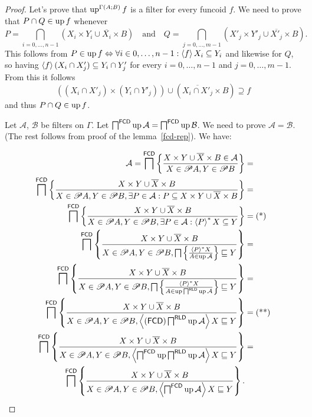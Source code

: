 \begin{proof}
Let's prove that $\operatorname{up}^{\Gamma(A;B)}f$ is a filter for every funcoid
$f$. We need to prove that $P\cap Q\in\operatorname{up} f$ whenever 
\[
P=\bigcap_{i=0,\ldots,n-1}\left(X_{i}\times Y_{i}\cup\overline{X_{i}}\times B\right)\quad\text{and}\quad Q=\bigcap_{j=0,\ldots,m-1}\left(X'_{j}\times Y'_{j}\cup\overline{X'_{j}}\times B\right).
\]
This follows from $P\in\operatorname{up} f\Leftrightarrow\forall i\in0,\ldots,n-1:\left\langle f\right\rangle X_{i}\subseteq Y_{i}$
and likewise for $Q$, so having $\left\langle f\right\rangle(X_{i}\cap X'_{j})\subseteq Y_{i}\cap Y'_{j}$
for every $i=0,\ldots,n-1$ and $j=0,\ldots,m-1$. From this it follows
\[
((X_{i}\cap X'_{j})\times(Y_{i}\cap Y'_{j}))\cup\left(\overline{X_{i}\cap X'_{j}}\times B\right)\supseteq f
\]
and thus $P\cap Q\in\operatorname{up} f$.

Let $\mathcal{A}$, $\mathcal{B}$ be filters on $\Gamma$. Let $\bigsqcap^{\mathsf{FCD}}\operatorname{up}\mathcal{A}=\bigsqcap^{\mathsf{FCD}}\operatorname{up}\mathcal{B}$.
We need to prove $\mathcal{A}=\mathcal{B}$. (The rest follows from
proof of the lemma~\ref{fcd-rep}). We have:

\begin{align*}
\mathcal{A}=\bigsqcap^{\mathsf{FCD}}\left\{ \frac{X\times Y\cup\overline{X}\times B\in\mathcal{A}}{X\in\mathscr{P} A,Y\in\mathscr{P} B}\right\} & =\\
\bigsqcap^{\mathsf{FCD}}\left\{ \frac{X\times Y\cup\overline{X}\times B}{X\in\mathscr{P} A,Y\in\mathscr{P} B,\exists P\in\mathcal{A}:P\subseteq X\times Y\cup\overline{X}\times B}\right\} & =\\
\bigsqcap^{\mathsf{FCD}}\left\{ \frac{X\times Y\cup\overline{X}\times B}{X\in\mathscr{P} A,Y\in\mathscr{P} B,\exists P\in\mathcal{A}:\left\langle P\right\rangle ^{\ast}X\subseteq Y}\right\} & =\text{(*)}\\
\bigsqcap^{\mathsf{FCD}}\left\{ \frac{X\times Y\cup\overline{X}\times B}{X\in\mathscr{P} A,Y\in\mathscr{P} B,\bigsqcap\left\{ \frac{\left\langle P\right\rangle ^{\ast}X}{A\in\operatorname{up}\mathcal{A}}\right\}\sqsubseteq Y}\right\} & =\\
\bigsqcap^{\mathsf{FCD}}\left\{ \frac{X\times Y\cup\overline{X}\times B}{X\in\mathscr{P} A,Y\in\mathscr{P} B,\bigsqcap\left\{ \frac{\left\langle P\right\rangle ^{\ast}X}{A\in\operatorname{up}\bigsqcap^{\mathsf{RLD}}\operatorname{up}\mathcal{A}}\right\}\sqsubseteq Y}\right\} & =\\
\bigsqcap^{\mathsf{FCD}}\left\{ \frac{X\times Y\cup\overline{X}\times B}{X\in\mathscr{P} A,Y\in\mathscr{P} B,\left\langle (\mathsf{FCD})\bigsqcap^{\mathsf{RLD}}\operatorname{up}\mathcal{A}\right\rangle X\sqsubseteq Y}\right\} & =\text{(**)}\\
\bigsqcap^{\mathsf{FCD}}\left\{ \frac{X\times Y\cup\overline{X}\times B}{X\in\mathscr{P} A,Y\in\mathscr{P} B,\left\langle \bigsqcap^{\mathsf{FCD}}\operatorname{up}\bigsqcap^{\mathsf{RLD}}\operatorname{up}\mathcal{A}\right\rangle X\sqsubseteq Y}\right\} & =\\
\bigsqcap^{\mathsf{FCD}}\left\{ \frac{X\times Y\cup\overline{X}\times B}{X\in\mathscr{P} A,Y\in\mathscr{P} B,\left\langle \bigsqcap^{\mathsf{FCD}}\operatorname{up}\mathcal{A}\right\rangle X\sqsubseteq Y}\right\}.
\end{align*}



\end{proof}
